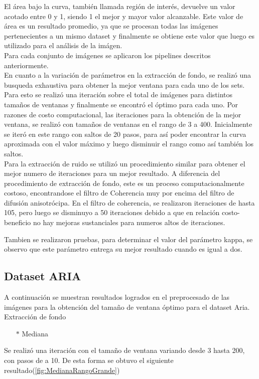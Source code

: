 El área bajo la curva, también llamada región de interés, devuelve un valor acotado entre 0 y 1, siendo 1 el mejor y mayor valor alcanzable. Este valor de área es un resultado promedio, ya que se procesan todas las imágenes pertenecientes a un mismo dataset y finalmente se obtiene este valor que luego es utilizado para el análisis de la imágen.\\

Para cada conjunto de imágenes se aplicaron los pipelines descritos anteriormente.\\
En cuanto a la variación de parámetros en la extracción de fondo, se realizó una busqueda exhaustiva para obtener la mejor ventana para cada uno de los sets. Para esto se realizó una iteración sobre el total de imágenes para distintos tamaños de ventanas y finalmente se encontró el óptimo para cada uno. Por razones de costo computacional, las iteraciones para la obtención de la mejor ventana, se realizó con tamaños de ventanas en el rango de 3 a 400. Inicialmente se iteró en este rango con saltos de 20 pasos, para así poder encontrar la curva aproximada con el valor máximo y luego disminuir el rango como así también los saltos.\\

Para la extracción de ruido se utilizó un procedimiento similar para obtener el mejor numero de iteraciones para un mejor resultado. A diferencia del procedimiento de extracción de fondo, este es un proceso computacionalmente costoso, encontrandose el filtro de Coherencia muy por encima del filtro de difusión anisotrócipa.
En el filtro de coherencia, se realizaron iteraciones de hasta 105, pero luego se disminuyo a 50 iteraciones debido a que en relación costo-beneficio no hay mejoras sustanciales para numeros altos de iteraciones.

Tambien se realizaron pruebas, para determinar el valor del parámetro kappa, se observo que este parámetro entrega su mejor resultado cuando es igual a dos.


\subsection{Dataset ARIA}

A continuación se muestran resultados logrados en el preprocesado de las imágenes para la obtención del tamaño de ventana óptimo para el dataset Aria.\\

Extracción de fondo
\begin{itemize}
	\item[$*$]Mediana 
\end{itemize}
Se realiz\'o una iteraci\'on con el tamaño de ventana variando desde 3 hasta 200, con pasos de a 10. De esta forma se obtuvo el siguiente resultado(\ref{fig:MedianaRangoGrande})\\

